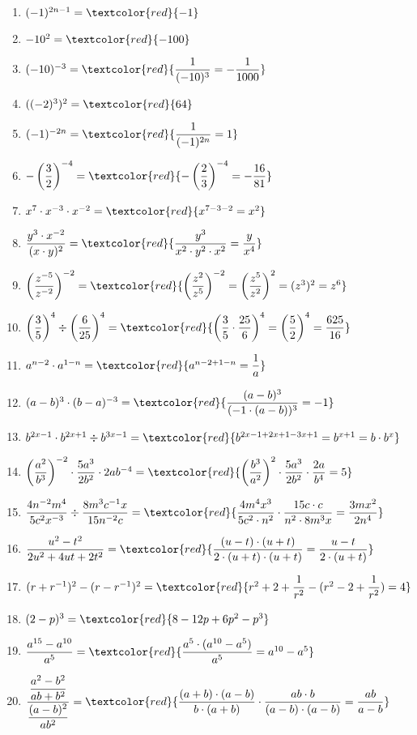 \documentclass[11pt, a4paper, twoside, fleqn]{article}
\begin{document}
\begin{enumerate}[itemsep=3ex, leftmargin=*]
\item $ (-1)^{2n -1} = \textcolor{red}{-1} $
\item $ -10^{2} = \textcolor{red}{-100} $
\item $ (-10)^{-3} = \textcolor{red}{\dfrac{1}{(-10)^{3}} = -\dfrac{1}{1000}} $
\item $((-2)^{3})^{2} = \textcolor{red}{64} $
\item $ (-1)^{-2n} = \textcolor{red}{\dfrac{1}{(-1)^{2n}} = 1} $
\item $ -\left(\dfrac{3}{2}\right)^{-4} = \textcolor{red}{-\left(\dfrac{2}{3}\right)^{-4} = -\dfrac{16}{81}} $
\item $ x^7 \cdot x^{-3} \cdot x^{-2} = \textcolor{red}{x^{7-3-2} = x^{2}} $
\item $ \dfrac{y^{3} \cdot x^{-2}}{(x \cdot y)^2} =  \textcolor{red}{\dfrac{y^3}{x^{2}\cdot y^{2} \cdot x^{2}} = \dfrac{y}{x^4}} $
\item $ \left(\dfrac{z^{-5}}{z^{-2}}\right)^{-2} = \textcolor{red}{\left(\dfrac{z^{2}}{z^{5}}\right)^{-2} = \left(\dfrac{z^{5}}{z^{2}} \right)^{2} = (z^3)^2 = z^6} $
\item $ \left(\dfrac{3}{5}\right)^4 \div \left(\dfrac{6}{25}\right)^{4} = \textcolor{red}{\left(\dfrac{3}{5} \cdot \dfrac{25}{6} \right)^{4} = \left (\dfrac{5}{2}\right)^{4} = \dfrac{625}{16}} $ 
\item $ a^{n-2} \cdot a^{1-n} =\textcolor{red}{a^{n-2+1-n} = \dfrac{1}{a}} $
\item $ (a-b)^{3} \cdot (b-a)^{-3} = \textcolor{red}{\dfrac{(a-b)^3}{(-1 \cdot(a-b))^{3}}= -1} $
\item $ b^{2x-1} \cdot b^{2x+1} \div b^{3x-1} = \textcolor{red}{b^{2x-1+2x+1-3x+1} = b^{x+1} = b \cdot b^{x}} $
\item $ \left(\dfrac{a^{2}}{b^{3}} \right)^{-2} \cdot \dfrac{5a^{3}}{2b^{2}} \cdot 2ab^{-4} = \textcolor{red}{\left(\dfrac{b^{3}}{a^2}\right)^{2} \cdot \dfrac{5a^3}{2b^2} \cdot \dfrac{2a}{b^{4}} = 5} $
\item $ \dfrac{4n^{-2} m^{4}}{5c^{2} x^{-3}} \div \dfrac{8m^{3}c^{-1}x}{15n^{-2}c} =\textcolor{red}{\dfrac{4m^{4}x^{3}}{5c^{2} \cdot n^{2}} \cdot \dfrac{15c \cdot c }{n^{2} \cdot 8m^{3}x} = \dfrac{3mx^{2}}{2n^{4}}} $
\item $ \dfrac{u^{2} - t^{2}}{2u^{2} + 4ut + 2t^{2}} = \textcolor{red}{\dfrac{(u-t) \cdot (u+t)}{2 \cdot (u+t) \cdot (u+t)} = \dfrac{u-t}{2 \cdot (u+t)}} $
\item $ (r+r^{-1})^2 - (r-r^{-1})^2 = \textcolor{red}{r^{2} + 2 + \dfrac{1}{r^{2}} - (r^{2} -2 + \dfrac{1}{r^{2}}) = 4} $
\item $ (2-p)^{3} = \textcolor{red}{8-12p+6p^{2}-p^3} $
\item $ \dfrac{a^{15} - a^{10}} {a^{5}} = \textcolor{red}{\dfrac{a^{5} \cdot (a^{10} - a^{5})}{a^{5}} = a^{10} - a^{5}} $
\item $ \dfrac{\dfrac{a^{2} - b^{2}}{ab + b^{2}}}{\dfrac{(a-b)^{2}}{ab^{2}}} = \textcolor{red}{\dfrac{(a+b) \cdot (a-b)}{b \cdot (a+b)} \cdot \dfrac{ab \cdot b}{(a-b) \cdot (a-b)} = \dfrac{ab}{a-b}}$ 
\end{enumerate}
\end{document}
